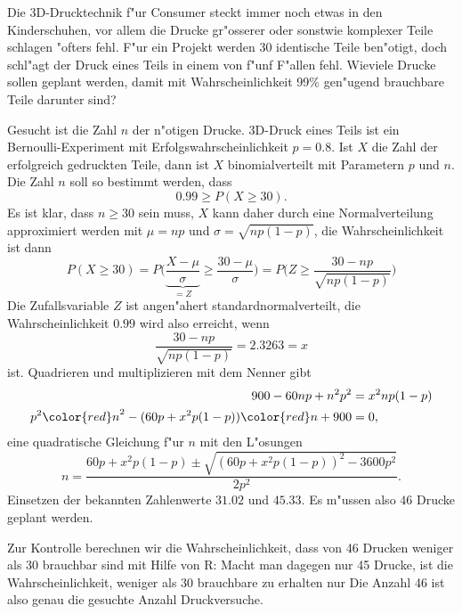 Die 3D-Drucktechnik f"ur Consumer steckt immer noch etwas in den 
Kinderschuhen, vor allem die Drucke gr"osserer oder sonstwie komplexer
Teile schlagen "ofters fehl.
F"ur ein Projekt werden 30 identische Teile ben"otigt,
doch schl"agt der Druck eines Teils in einem von f"unf F"allen fehl.
Wieviele Drucke sollen geplant werden, damit mit Wahrscheinlichkeit 99\%
gen"ugend brauchbare Teile darunter sind?

\begin{loesung}
Gesucht ist die Zahl $n$ der n"otigen Drucke.
3D-Druck eines Teils ist ein Bernoulli-Experiment mit
Erfolgswahrscheinlichkeit $p=0.8$.
Ist $X$ die Zahl der erfolgreich gedruckten Teile, dann ist $X$
binomialverteilt mit Parametern $p$ und $n$.
Die Zahl $n$ soll so bestimmt werden, dass 
\[
0.99 \ge P(X\ge 30).
\]
Es ist klar, dass $n\ge 30$ sein muss, $X$ kann daher durch eine
Normalverteilung approximiert werden mit $\mu=np$ und $\sigma=\sqrt{np(1-p)}$,
die Wahrscheinlichkeit ist dann
\[
P(X\ge 30)=P\biggl(
\underbrace{\frac{X-\mu}{\sigma}}_{=Z}\ge\frac{30-\mu}{\sigma}
\biggr)
=P\biggl(Z\ge \frac{30-np}{\sqrt{np(1-p)}}\biggr)
\]
Die Zufallsvariable $Z$ ist angen"ahert standardnormalverteilt, die
Wahrscheinlichkeit $0.99$ wird also erreicht, wenn 
\[
\frac{30-np}{\sqrt{np(1-p)}} = 2.3263=x
\]
ist.
Quadrieren und multiplizieren mit dem Nenner gibt
\begin{align*}
900-60np+n^2p^2
&=
x^2 np(1-p)
\\
p^2{\color{red}n}^2-(60p+x^2p(1-p)){\color{red}n}+900&=0,
\end{align*}
eine quadratische Gleichung f"ur $n$ mit den L"osungen
\[
n=\frac{60p+x^2p(1-p)\pm\sqrt{(60p+x^2p(1-p))^2 - 3600p^2}}{2p^2}.
\]
Einsetzen der bekannten Zahlenwerte $31.02$ und $45.33$.
Es m"ussen also $46$ Drucke geplant werden.

Zur Kontrolle berechnen wir die Wahrscheinlichkeit, dass von 46 Drucken
weniger als 30 brauchbar sind mit Hilfe von R:
Macht man dagegen nur 45 Drucke, ist die Wahrscheinlichkeit, weniger als
30 brauchbare zu erhalten nur
Die Anzahl 46 ist also genau die gesuchte Anzahl Druckversuche.
\end{loesung}



